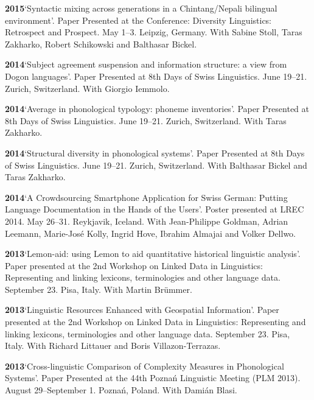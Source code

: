 \documentclass[11pt]{article}
\newcommand{\hangpara}{
 \setlength{\parindent}{0in} %
 \hangindent=0.42in %
}
\begin{document}
\vskip 6pt
\hangpara
{\bf 2015}\hspace{1ex}`Syntactic mixing across generations in a Chintang/Nepali bilingual environment'. Paper Presented at the Conference: Diversity Linguistics: Retrospect and Prospect. May 1--3. Leipzig, Germany. With Sabine Stoll, Taras Zakharko, Robert Schikowski and Balthasar Bickel.

\vskip 6pt
\hangpara
{\bf 2014}\hspace{1ex}`Subject agreement suspension and information structure: a view from Dogon languages'. Paper Presented at 8th Days of Swiss Linguistics. June 19--21. Zurich, Switzerland. With Giorgio Iemmolo.

\vskip 6pt
\hangpara
{\bf 2014}\hspace{1ex}`Average in phonological typology: phoneme inventories'. Paper Presented at 8th Days of Swiss Linguistics. June 19--21. Zurich, Switzerland. With Taras Zakharko.

\vskip 6pt
\hangpara
{\bf 2014}\hspace{1ex}`Structural diversity in phonological systems'. Paper Presented at 8th Days of Swiss Linguistics. June 19--21. Zurich, Switzerland. With Balthasar Bickel and Taras Zakharko.

\vskip 6pt
\hangpara
{\bf 2014}\hspace{1ex}`A Crowdsourcing Smartphone Application for Swiss German: Putting Language Documentation in the Hands of the Users'. Poster presented at LREC 2014. May 26--31. Reykjavik, Iceland. With Jean-Philippe Goldman, Adrian Leemann, Marie-Jos{\'e} Kolly, Ingrid Hove, Ibrahim Almajai and Volker Dellwo.

\vskip 6pt
\hangpara
{\bf 2013}\hspace{1ex}`Lemon-aid: using Lemon to aid quantitative historical linguistic analysis'. Paper presented at the 2nd Workshop on Linked Data in Linguistics: Representing and linking lexicons, terminologies and other language data. September 23. Pisa, Italy. With Martin Brümmer. 

\vskip 6pt
\hangpara
{\bf 2013}\hspace{1ex}`Linguistic Resources Enhanced with Geospatial Information'. Paper presented at the 2nd Workshop on Linked Data in Linguistics: Representing and linking lexicons, terminologies and other language data. September 23. Pisa, Italy. With Richard Littauer and Boris Villazon-Terrazas.

\vskip 6pt
\hangpara
{\bf 2013}\hspace{1ex}`Cross-linguistic Comparison of Complexity Measures in Phonological Systems'. Paper Presented at the 44th Pozna{\'n} Linguistic Meeting (PLM 2013). August 29--September 1. Pozna{\'n}, Poland. With Dami{\'a}n Blasi.
\end{document}
